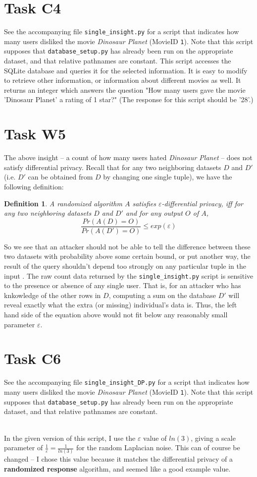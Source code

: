 \documentclass{article}
\newtheorem*{defi}{Definition}
\providecommand{\task}[1]{\section{Task #1}}
\providecommand{\inlinecode}{\texttt}
\begin{document}
\task{C4}
See the accompanying file \inlinecode{single\_insight.py} for a script that indicates how many users disliked the movie \textit{Dinosaur Planet} (MovieID \inlinecode{1}). Note that this script supposes that \inlinecode{database\_setup.py} has already been run on the appropriate dataset, and that relative pathnames are constant. This script accesses the SQLite database and queries it for the selected information. It is easy to modify to retrieve other information, or information about different movies as well. It returns an integer which answers the question "How many users gave the movie 'Dinosaur Planet' a rating of 1 star?" (The response for this script should be '28'.)

\task{W5}
The above insight -- a count of how many users hated \textit{Dinosaur Planet} -- does not satisfy differential privacy. Recall that for any two neighboring datasets $D$ and $D'$ (i.e. $D'$ can be obtained from $D$ by changing one single tuple), we have the following definition:

\begin{defi}
A randomized algorithm $A$ satisfies $\varepsilon$-differential privacy, iff for any two neighboring datasets $D$ and $D'$ and for any output $O$ of $A$,
$$ \frac{Pr(A(D) = O)}{Pr(A(D') = O)} \leq exp(\varepsilon) $$
\end{defi}
So we see that an attacker should not be able to tell the difference between these two datasets with probability above some certain bound, or put another way, the result of the query shouldn't depend too strongly on any particular tuple in the input \cite{xiaoDP}. The raw count data returned by the \inlinecode{single\_insight.py} script is sensitive to the presence or absence of any single user. That is, for an attacker who has knkowledge of the other rows in $D$, computing a sum on the database $D'$ will reveal exactly what the extra (or missing) individual's data is. Thus, the left hand side of the equation above would not fit below any reasonably small parameter $\varepsilon$.

\task{C6}
See the accompanying file \inlinecode{single\_insight\_DP.py} for a script that indicates how many users disliked the movie \textit{Dinosaur Planet} (MovieID \inlinecode{1}). Note that this script supposes that \inlinecode{database\_setup.py} has already been run on the appropriate dataset, and that relative pathnames are constant. \par
 \\
In the given version of this script, I use the $\varepsilon$ value of $ln(3)$, giving a scale parameter of $\frac{1}{\varepsilon} = \frac{1}{ln(3)}$ for the random Laplacian noise. This can of course be changed -- I chose this value because it matches the differential privacy of a \textbf{randomized response} algorithm, and seemed like a good example value.
\end{document}
